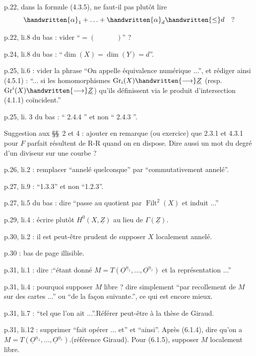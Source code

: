 p.22, dans la formule (4.3.5), ne faut-il pas plutôt lire
\[
\handwritten{\alpha}_1+\ldots+\handwritten{\alpha}_d\handwritten{\leq}d\quad ?
\]


p.22, li.8 du bas : vider ``$=(\hspace{3em})$'' ?

p.24, li.8 du bas : ``$\dim(X)=\dim(Y)=d$''.

p.25, li.6 : vider la phrase ``On appelle équivalence numérique ...'', et rédiger ainsi (4.5.1) : ``... si les homomorphismes $\operatorname{Gr}_i(X)\handwritten{\longrightarrow}\underline{Z}$ (resp. $\operatorname{Gr}^i(X)\handwritten{\longrightarrow}\underline{Z}$) qu'ils définissent via le produit d'intersection (4.1.1) coïncident.''

p.25, li. 3 du bas : `` 2.4.4 '' et non `` 2.4.3 ''.

Suggestion aux \S\S\ 2 et 4 : ajouter en remarque (ou exercice) que
2.3.1 et 4.3.1 pour $F$ parfait résultent de R-R quand on en dispose. Dire aussi un mot du degré d'un diviseur sur une courbe ?

p.26, li.2 :  remplacer ``annelé quelconque'' par ``commutativement annelé''.

p.27, li.9 : ``1.3.3'' et non ``1.2.3''.

p.27, li.5 du bas : dire ``passe au quotient par $\operatorname{Filt}^{2}(X)$ et induit ...''

p.29, li.4 : écrire plutôt $H^0(X,\underline{Z})$  au lieu de $\Gamma(\underline{Z})$.

p.30, li.2 : il est peut-être prudent de supposer $X$ localement annelé.

p.30 : bas de page illisible.

p.31, li.1 : dire :``étant donné $M=T(\underline{O}^{\underline{n}_1},\ldots,\underline{O}^{\underline{n}_r})$ et la représentation ...''

p.31, li.4 : pourquoi supposer $M$ libre ? dire simplement ``par recollement de $M$ sur des cartes ...'' ou ``de la façon suivante.'', ce qui est  encore mieux.

p.31, li.7 : ``tel que l'on ait ...''.Référer peut-être à la thèse de Giraud.

p.31, li.12 : supprimer ``fait opérer ... et'' et ``ainsi''. Après (6.1.4), dire qu'on  a $M=T(\underline{O}^{\underline{n}_1},\ldots,\underline{O}^{\underline{n}_r})$.(référence Giraud). Pour (6.1.5), supposer $M$ localement libre.

